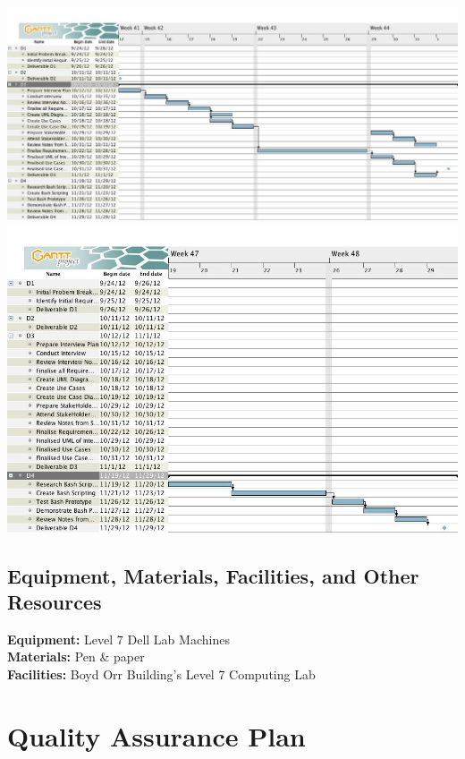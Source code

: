 \documentclass{l3deliverable}
\begin{document}
{\includegraphics[scale=0.3]{img/GANTTD3.jpg}\\
\includegraphics[scale=0.5]{img/GANTTD4.jpg}\\




\subsection{Equipment, Materials, Facilities, and Other Resources}
\textbf{Equipment:} Level 7 Dell Lab Machines\\
\textbf{Materials:} Pen \& paper\\
\textbf{Facilities:} Boyd Orr Building's Level 7 Computing Lab\\


\section{Quality Assurance Plan}


}
\end{document}
